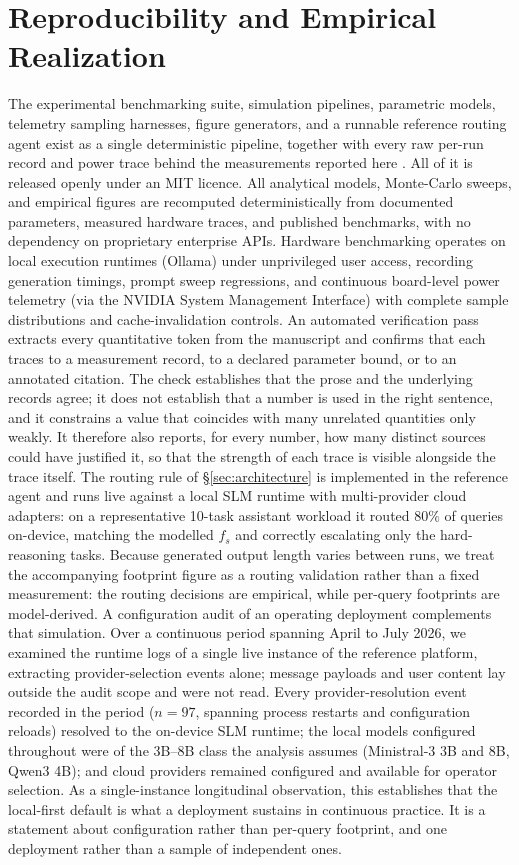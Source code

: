 \documentclass[conference]{IEEEtran}
\newcommand{\fs}{f_{s}}
\begin{document}
\section*{Reproducibility and Empirical Realization}
The experimental benchmarking suite, simulation pipelines, parametric models,
telemetry sampling harnesses, figure generators, and a runnable reference
routing agent exist as a single deterministic pipeline, together with every
raw per-run record and power trace behind the measurements reported here
\cite{autoyou2026measure}. All of it is released openly under an MIT
licence. All analytical models, Monte-Carlo sweeps,
and empirical figures are recomputed deterministically from documented
parameters, measured hardware traces, and published benchmarks, with no
dependency on proprietary enterprise APIs.
Hardware benchmarking operates on local execution runtimes (Ollama) under
unprivileged user access, recording generation timings, prompt sweep regressions,
and continuous board-level power telemetry (via the NVIDIA System Management
Interface) with complete sample distributions and cache-invalidation controls.
An automated verification pass extracts every quantitative token from the
manuscript and confirms that each traces to a measurement record, to a declared
parameter bound, or to an annotated citation. The check establishes that the
prose and the underlying records agree; it does not establish that a number is
used in the right sentence, and it constrains a value that coincides with many
unrelated quantities only weakly. It therefore also reports, for every number,
how many distinct sources could have justified it, so that the strength of each
trace is visible alongside the trace itself.
The routing rule of \S\ref{sec:architecture} is implemented in the
reference agent and runs live against a local SLM runtime with multi-provider
cloud adapters: on a representative 10-task assistant workload it routed $80\%$
of queries on-device, matching the modelled $\fs$ and correctly escalating only
the hard-reasoning tasks. Because generated output length varies between runs,
we treat the accompanying footprint figure as a routing validation rather than
a fixed measurement: the routing decisions are empirical, while per-query
footprints are model-derived.
A configuration audit of an operating deployment complements that simulation.
Over a continuous period spanning April to July 2026, we examined the runtime
logs of a single live instance of the reference platform, extracting
provider-selection events alone; message payloads and user content lay outside
the audit scope and were not read. Every provider-resolution event recorded in
the period ($n=97$, spanning process restarts and configuration reloads)
resolved to the on-device SLM runtime; the local models configured throughout
were of the 3B--8B class the analysis assumes (Ministral-3 3B and 8B, Qwen3
4B); and cloud providers remained configured and available for operator
selection. As a single-instance longitudinal observation, this establishes that
the local-first default is what a deployment sustains in continuous practice.
It is a statement about configuration rather than per-query footprint, and one
deployment rather than a sample of independent ones.



\end{document}
